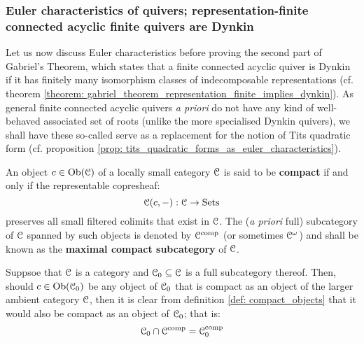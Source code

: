         \subsubsection{Euler characteristics of quivers; representation-finite connected acyclic finite quivers are Dynkin}
            Let us now discuss Euler characteristics before proving the second part of Gabriel's Theorem, which states that a finite connected acyclic quiver is Dynkin if it has finitely many isomorphism classes of indecomposable representations (cf. theorem \ref{theorem: gabriel_theorem_representation_finite_implies_dynkin}). As general finite connected acyclic quivers \textit{a priori} do not have any kind of well-behaved associated set of roots (unlike the more specialised Dynkin quivers), we shall have these so-called  serve as a replacement for the notion of Tits quadratic form (cf. proposition \ref{prop: tits_quadratic_forms_as_euler_characteristics}).
            \begin{definition} \label{def: compact_objects}
                An object $c \in \mathrm{Ob}(\mathcal{C})$ of a locally small category $\mathcal{C}$ is said to be \textbf{compact} if and only if the representable copresheaf:
                    $$\mathcal{C}(c, -): \mathcal{C} \to \mathrm{Sets}$$
                preserves all small filtered colimits that exist in $\mathcal{C}$. The (\textit{a priori} full) subcategory of $\mathcal{C}$ spanned by such objects is denoted by $\mathcal{C}^{\mathrm{comp}}$ (or sometimes $\mathcal{C}^{\omega}$) and shall be known as the \textbf{maximal compact subcategory} of $\mathcal{C}$. 
            \end{definition}
            \begin{remark} \label{remark: compact_objects_in_full_subcategories}
                Suppsoe that $\mathcal{C}$ is a category and $\mathcal{C}_0 \subseteq \mathcal{C}$ is a full subcategory thereof. Then, should $c \in \mathrm{Ob}(\mathcal{C}_0)$ be any object of $\mathcal{C}_0$ that is compact as an object of the larger ambient category $\mathcal{C}$, then it is clear from definition \ref{def: compact_objects} that it would also be compact as an object of $\mathcal{C}_0$; that is:
                    $$\mathcal{C}_0 \cap \mathcal{C}^{\mathrm{comp}} = \mathcal{C}_0^{\mathrm{comp}}$$
            \end{remark}
            \begin{example} \label{example: finitely_generated_modules_are_compact}
                
            \end{example}
